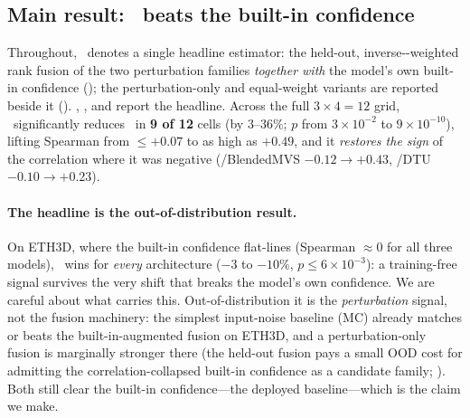 \subsection{Main result: \trustr\ beats the built-in confidence}
\label{sec:exp-main}

Throughout, \trustr\ denotes a single headline estimator: the held-out, inverse-\ause-weighted rank
fusion of the two perturbation families \emph{together with} the model's own built-in confidence
(); the perturbation-only and equal-weight variants are reported beside it
(). , , and  report the headline.
Across the full $3{\times}4{=}12$ grid, \trustr\ significantly reduces \ause\ in \textbf{9 of 12}
cells (by $3\text{--}36\%$; $p$ from $3{\times}10^{-2}$ to $9{\times}10^{-10}$), lifting Spearman
from $\le{+}0.07$ to as high as $+0.49$, and it \emph{restores the sign} of the correlation where it
was negative (\vggt/BlendedMVS $-0.12\to+0.43$, \mastr/DTU $-0.10\to+0.23$).

\paragraph{The headline is the out-of-distribution result.} On ETH3D, where the built-in confidence
flat-lines (Spearman $\approx 0$ for all three models), \trustr\ wins for \emph{every} architecture
($-3$ to $-10\%$, $p\le 6{\times}10^{-3}$): a training-free signal survives the very shift that breaks
the model's own confidence. We are careful about what carries this. Out-of-distribution it is the
\emph{perturbation} signal, not the fusion machinery: the simplest input-noise baseline (MC) already
matches or beats the built-in-augmented fusion on ETH3D, and a perturbation-only fusion is marginally
stronger there (the held-out fusion pays a small OOD cost for admitting the correlation-collapsed
built-in confidence as a candidate family; ). Both still clear the built-in
confidence---the deployed baseline---which is the claim we make.

